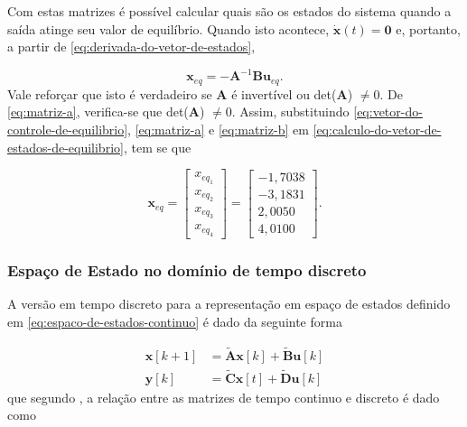 Com estas matrizes é possível calcular quais são os estados do sistema quando a
saída atinge seu valor de equilíbrio. Quando isto acontece, $\mathbf{\dot{x}}(t)
= \mathbf{0}$ e, portanto, a partir de \ref{eq:derivada-do-vetor-de-estados},

\begin{equation}
    \label{eq:calculo-do-vetor-de-estados-de-equilibrio}
    \mathbf{x}_{eq} = -\mathbf{A}^{-1}\mathbf{B}\mathbf{u}_{eq}.
\end{equation} Vale reforçar que isto é verdadeiro se $\mathbf{A}$ é invertível
ou det($\mathbf{A}$) $\neq 0$. De \ref{eq:matriz-a}, verifica-se que
det($\mathbf{A}$) $\neq 0$. Assim, substituindo
\ref{eq:vetor-do-controle-de-equilibrio}, \ref{eq:matriz-a} e \ref{eq:matriz-b}
em \ref{eq:calculo-do-vetor-de-estados-de-equilibrio}, tem se que

\begin{equation}
    \label{eq:estados-de-equilibrio}
    \mathbf{x}_{eq} =
    \begin{bmatrix}
        x_{eq_{1}} \\
        x_{eq_{2}} \\
        x_{eq_{3}} \\
        x_{eq_{4}}
    \end{bmatrix}
    =
    \begin{bmatrix}
        -1,7038 \\
        -3,1831 \\
        2,0050  \\
        4,0100
    \end{bmatrix}\text{.}
\end{equation}

\subsubsection{Espaço de Estado no domínio de tempo discreto}
\label{subsub:espaco-de-estados-no-dominio-de-tempo-discreto}

A versão em tempo discreto para a representação em espaço de estados definido em
\ref{eq:espaco-de-estados-continuo} é dado da seguinte forma

\begin{subequations}
    \label{eq:espaco-de-estados-discreto}
    \begin{align}
        \mathbf{x}[k+1] & = \mathbf{\tilde{A}}\mathbf{x}[k] + \mathbf{\tilde{B}}\mathbf{u}[k]
        \label{eq:estimativa-do-vetor-de-estados}                                             \\
        \mathbf{y}[k]   & = \mathbf{\tilde{C}}\mathbf{x}[t] + \mathbf{\tilde{D}}\mathbf{u}[k]
        \label{eq:saida-do-sistema-em-espaco-de-estados-discreto}
    \end{align}
\end{subequations} que segundo , a relação entre as
matrizes de tempo continuo e discreto é dado como

